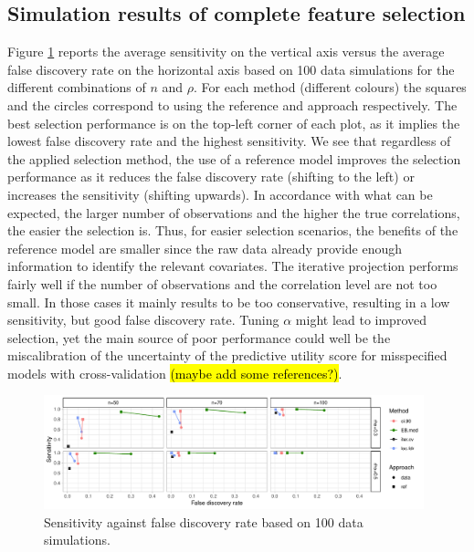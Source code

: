 \documentclass[american,]{article}
\theoremstyle{definition}
\begin{document}


\subsection{Simulation results of complete feature selection}

Figure \ref{fig:sensitivity_vs_fdr_iterated} reports the average sensitivity on
the vertical axis versus the average false discovery rate on the
horizontal axis based on 100 data simulations for the different
combinations of $n$ and $\rho$. For each method (different colours)
the squares and the circles correspond to using the reference and
approach respectively. The best selection performance is on the
top-left corner of each plot, as it implies the lowest false discovery
rate and the highest sensitivity. We see that regardless of the
applied selection method, the use of a reference model improves the
selection performance as it reduces the false discovery rate (shifting
to the left) or increases the sensitivity (shifting upwards). In
accordance with what can be expected, the larger number of
observations and the higher the true correlations, the easier the
selection is. Thus, for easier selection scenarios, the benefits of
the reference model are smaller since the raw data already provide
enough information to identify the relevant covariates. The iterative
projection performs fairly well if the number of observations and the correlation level
are not too small. In those cases it mainly results to be too conservative, resulting in a low
sensitivity, but good false discovery rate. Tuning $\alpha$ might lead to improved selection, yet
the main source of poor performance could well be the miscalibration of the uncertainty of the predictive
utility score for misspecified models with cross-validation \hl{(maybe add some references?)}.

\begin{figure}[tp]
  \centering
  \includegraphics[width=0.98\textwidth]{graphics/sensitivity_vs_fdr_iterated.pdf}
  \caption{Sensitivity against false discovery rate based on 100 data simulations.\\}
  \label{fig:sensitivity_vs_fdr_iterated}
\end{figure}
\end{document}

